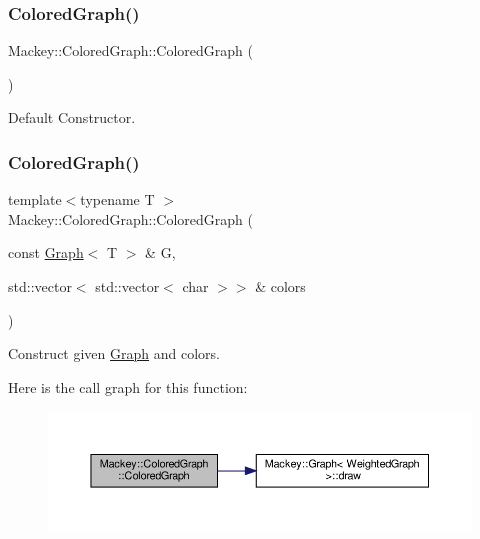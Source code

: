 \subsubsection{\texorpdfstring{Colored\+Graph()}{ColoredGraph()}\hspace{0.1cm}{\footnotesize\ttfamily [1/2]}}
{\footnotesize\ttfamily Mackey\+::\+Colored\+Graph\+::\+Colored\+Graph (\begin{DoxyParamCaption}{ }\end{DoxyParamCaption})\hspace{0.3cm}{\ttfamily [inline]}}



Default Constructor. 

\mbox{\label{classMackey_1_1ColoredGraph_a2e2d70fa6163019d8bf0dd92b3d39342}} 
\subsubsection{\texorpdfstring{Colored\+Graph()}{ColoredGraph()}\hspace{0.1cm}{\footnotesize\ttfamily [2/2]}}
{\footnotesize\ttfamily template$<$typename T $>$ \\
Mackey\+::\+Colored\+Graph\+::\+Colored\+Graph (\begin{DoxyParamCaption}\item[{const \hyperlink{classMackey_1_1Graph}{Graph}$<$ T $>$ \&}]{G,  }\item[{std\+::vector$<$ std\+::vector$<$ char $>$$>$ \&}]{colors }\end{DoxyParamCaption})\hspace{0.3cm}{\ttfamily [inline]}}



Construct given \hyperlink{classMackey_1_1Graph}{Graph} and colors. 

Here is the call graph for this function\+:\nopagebreak
\begin{figure}[H]
\begin{center}
\leavevmode
\includegraphics[width=350pt]{classMackey_1_1ColoredGraph_a2e2d70fa6163019d8bf0dd92b3d39342_cgraph}
\end{center}
\end{figure}


